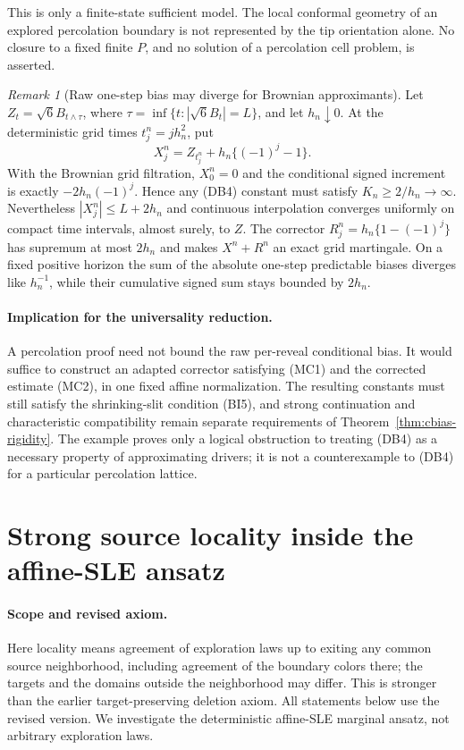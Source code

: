 \documentclass[11pt]{article}
\theoremstyle{definition}\newtheorem{definition}[theorem]{Definition}
\theoremstyle{remark}\newtheorem{remark}[theorem]{Remark}
\begin{document}
This is only a finite-state sufficient model. The local conformal
geometry of an explored percolation boundary is not represented by the
tip orientation alone. No closure to a fixed finite $P$, and no solution
of a percolation cell problem, is asserted.

\begin{remark}[Raw one-step bias may diverge for Brownian approximants]
\label{ex:oscillatory-bias}
Let $Z_t=\sqrt6 B_{t\wedge\tau}$, where
$\tau=\inf\{t:|\sqrt6 B_t|=L\}$, and let $h_n\downarrow0$.
At the deterministic grid times $t_j^n=jh_n^2$, put
\[
 X^n_j=Z_{t^n_j}+h_n\{(-1)^j-1\}.
 \tag{MC5}
\]
With the Brownian grid filtration, $X^n_0=0$ and the conditional signed
increment is exactly $-2h_n(-1)^j$. Hence any (DB4) constant must satisfy
$K_n\ge2/h_n\to\infty$. Nevertheless $|X^n_j|\le L+2h_n$ and
continuous interpolation converges uniformly on compact time intervals,
almost surely, to $Z$. The corrector
$R^n_j=h_n\{1-(-1)^j\}$ has supremum at most $2h_n$ and makes
$X^n+R^n$ an exact grid martingale. On a fixed positive horizon the sum
of the absolute one-step predictable biases diverges like $h_n^{-1}$,
while their cumulative signed sum stays bounded by $2h_n$.
\end{remark}

\paragraph{Implication for the universality reduction.}
A percolation proof need not bound the raw per-reveal conditional bias.
It would suffice to construct an adapted corrector satisfying (MC1)
and the corrected estimate (MC2), in one fixed affine normalization.
The resulting constants must still satisfy the shrinking-slit condition
(BI5), and strong continuation and characteristic compatibility remain
separate requirements of Theorem~\ref{thm:cbias-rigidity}.
The example proves only a logical obstruction to treating (DB4) as a
necessary property of approximating drivers; it is not a counterexample
to (DB4) for a particular percolation lattice.


\section{Strong source locality inside the affine-SLE ansatz}
\label{sec:strong-local-affine}

\paragraph{Scope and revised axiom.}
Here locality means agreement of exploration laws up to exiting any common
source neighborhood, including agreement of the boundary colors there; the
targets and the domains outside the neighborhood may differ. This is stronger
than the earlier target-preserving deletion axiom. All statements below use
the revised version. We investigate the deterministic affine-SLE marginal
ansatz, not arbitrary exploration laws.
\end{document}
